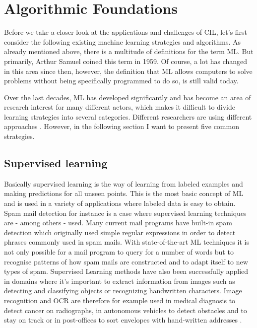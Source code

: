 \documentclass[conference]{IEEEtran}
\begin{document}
\section{Algorithmic Foundations}
\label{sec:algos}
Before we take a closer look at the applications and challenges of CIL, let's first consider the 
following existing machine learning strategies and algorithms. As already mentioned above, 
there is a multitude of definitions for the term ML\@. But primarily, Arthur Samuel 
coined this term in 1959. Of course, a lot has changed in this area since then, 
however, the definition that ML allows computers to solve problems without being 
specifically programmed to do so, is still valid today\cite{MLStudiesUsingCheckers:samuel}.

Over the last decades, ML has developed significantly and has become an area of
research interest for many different actors, which makes it difficult to divide learning 
strategies into several categories. Different researchers are using different approaches 
\cite{FoundationsOfML:mohri}\cite{Structure:corne}. 
However, in the following section I want to present five common strategies\cite{FoundationsOfML:mohri}.

\subsection{Supervised learning}
Basically supervised learning is the way of learning from labeled examples and making predictions 
for all unseen points. This is the most basic concept of ML and is used in a variety of applications 
where labeled data is easy to obtain. Spam mail detection for instance is a case where supervised learning 
techniques are - among others - used.
Many current mail programs have built-in spam detection which originally used
simple regular expressions in order to detect phrases commonly used in spam mails.
With state-of-the-art ML techniques it is not only possible for a mail program to 
query for a number of words but to recognise patterns of how spam mails are constructed and 
to adapt itself to new types of spam.
Supervised Learning methods have also been successfully applied in domains where it's 
important to extract information from images such as detecting and classifying 
objects or recognizing handwritten characters. Image 
recognition and OCR are therefore for example used in medical diagnosis to 
detect cancer on radiographs, in autonomous vehicles to detect obstacles and to 
stay on track or in post-offices to sort envelopes with hand-written addresses
\cite{DisciplineOfML:mitchell}. 
\end{document}
